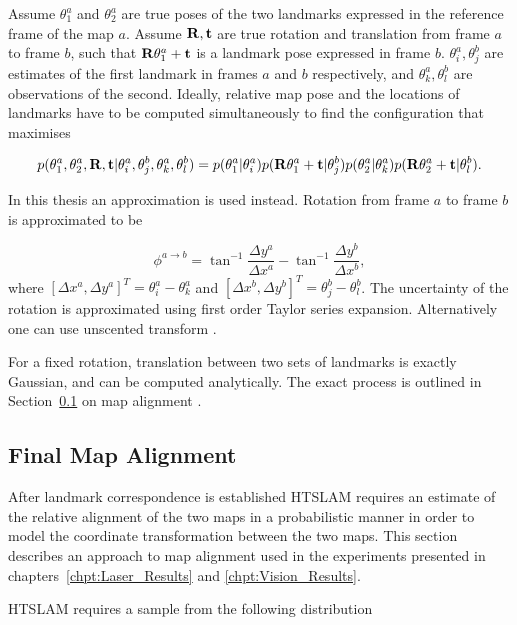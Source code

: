 Assume $\theta^a_1$ and $\theta^a_2$ are true poses of the two
landmarks expressed in the reference frame of the map $a$. Assume
${\bf R,t}$ are true rotation and translation from frame $a$ to frame
$b$, such that ${\bf R}\theta_1^a + \bf{t}$ is a landmark pose expressed
in frame $b$. $\theta^a_i, \theta^b_j$ are estimates of the first
landmark in frames $a$ and $b$ respectively, and $\theta^a_k,
\theta^b_l$ are observations of the second. Ideally, relative map
pose and the locations of landmarks have to be computed
simultaneously to find the configuration that maximises

\begin{equation}
p(\theta^a_1, \theta^a_2, {\bf R},{\bf t}|
  \theta^a_i, \theta^b_j, \theta^a_k, \theta^b_l) =
p(\theta^a_1 | \theta^a_i)
p({\bf R}\theta^a_1+{\bf t} | \theta^b_j)
p(\theta^a_2 | \theta^a_k)
p({\bf R}\theta^a_2+{\bf t} | \theta^b_l).
\label{eqn:true_alignment_prob}
\end{equation}

In this thesis an approximation is used instead.
Rotation from frame $a$ to frame $b$ is approximated to be

$$
  \phi^{a \rightarrow b} = \tan^{-1} \frac{\Delta y^a}{ \Delta x^a}
  -\tan^{-1} \frac{\Delta y^b}{ \Delta x^b},
$$
where $[\Delta x^a, \Delta y^a]^T = \theta^a_i - \theta^a_k$ and
$[\Delta x^b, \Delta y^b]^T = \theta^b_j - \theta^b_l$. The
uncertainty of the rotation is approximated using first order Taylor
series expansion. Alternatively one can use unscented transform
\cite{unscented}.

For a fixed rotation, translation between two sets of landmarks is
exactly Gaussian, and can be computed analytically. The exact process
is outlined in Section~\ref{sec:map_alignment} on map alignment .



\subsection{Final Map Alignment}
\label{sec:map_alignment}

After landmark correspondence is established HTSLAM requires an
estimate of the relative alignment of the two maps in a
probabilistic manner in order to model the coordinate transformation
between the two maps. This section describes an approach to map
alignment used in the experiments presented in
chapters~\ref{chpt:Laser_Results} and \ref{chpt:Vision_Results}.

HTSLAM requires a sample from the following distribution

